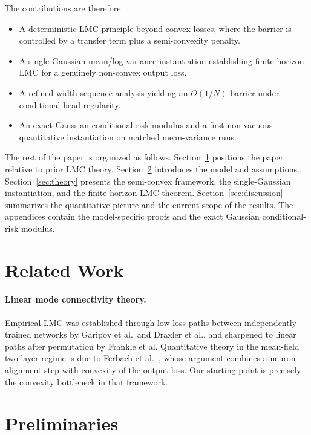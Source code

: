 \documentclass[11pt]{article}
\theoremstyle{definition}
\begin{document}
The contributions are therefore:
\begin{itemize}[leftmargin=*,itemsep=2pt]
  \item A deterministic LMC principle beyond convex losses, where the barrier is
    controlled by a transfer term plus a semi-convexity penalty.
  \item A single-Gaussian mean/log-variance instantiation establishing
    finite-horizon LMC for a genuinely non-convex output loss.
  \item A refined width-sequence analysis yielding an $O(1/N)$ barrier under
    conditional head regularity.
  \item An exact Gaussian conditional-risk modulus and a first non-vacuous
    quantitative instantiation on matched mean-variance runs.
\end{itemize}

The rest of the paper is organized as follows. Section~\ref{sec:related}
positions the paper relative to prior LMC theory. Section~\ref{sec:setup}
introduces the model and assumptions. Section~\ref{sec:theory} presents the
semi-convex framework, the single-Gaussian instantiation, and the finite-horizon
LMC theorem. Section~\ref{sec:discussion} summarizes the quantitative picture
and the current scope of the results. The appendices contain the model-specific
proofs and the exact Gaussian conditional-risk modulus.

\section{Related Work}
\label{sec:related}

\paragraph{Linear mode connectivity theory.}
Empirical LMC was established through low-loss paths between independently
trained networks by Garipov et al.\ and Draxler et al., and sharpened to linear
paths after permutation by Frankle et al. Quantitative theory in the mean-field
two-layer regime is due to Ferbach et al.~\cite{Ferbach2024}, whose argument
combines a neuron-alignment step with convexity of the output loss. Our starting
point is precisely the convexity bottleneck in that framework.

\section{Preliminaries}
\label{sec:setup}
\end{document}
